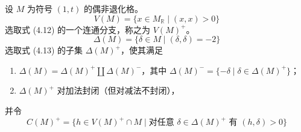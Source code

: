 设 $M$ 为符号 $(1,t)$ 的偶非退化格。
\begin{equation}
  V(M)=\{x\in M_{\mathbb{R}}\mid (x,x)>0\} \tag{4.12}
\end{equation}
选取式 (4.12) 的一个连通分支，称之为 $V(M)^{+}$。
\begin{equation}
  \Delta(M)=\{\delta\in M\mid(\delta,\delta)=-2\} \tag{4.13}
\end{equation}
选取式 (4.13) 的子集 $\Delta(M)^{+}$，使其满足
\begin{enumerate}[label=\arabic*.,leftmargin=2.2em]
  \item $\Delta(M)=\Delta(M)^{+}\coprod\Delta(M)^{-}$，其中 $\Delta(M)^{-}=\{-\delta\mid\delta\in\Delta(M)^{+}\}$；
  \item $\Delta(M)^{+}$ 对加法封闭（但对减法不封闭），
\end{enumerate}
并令
\begin{equation}
  C(M)^{+}=\{h\in V(M)^{+}\cap M\mid\text{对任意 }\delta\in\Delta(M)^{+}\text{ 有 }(h,\delta)>0\} \tag{4.14}
\end{equation}

